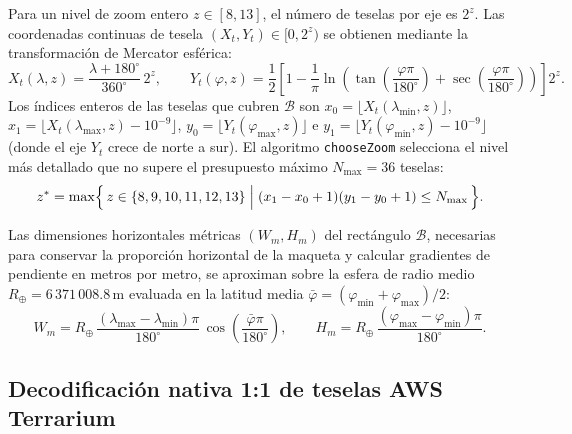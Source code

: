 \documentclass[11pt,a4paper]{article}
\newcommand{\unit}[1]{\mathrm{#1}}
\begin{document}
Para un nivel de zoom entero $z\in[8,13]$, el número de teselas por eje es $2^z$. Las coordenadas continuas
de tesela $(X_t,Y_t)\in[0,2^z)$ se obtienen mediante la transformación de Mercator esférica:
\begin{equation}
  X_t(\lambda,z) = \frac{\lambda + 180^\circ}{360^\circ}\,2^z,
  \qquad
  Y_t(\varphi,z) = \frac{1}{2}\left[
    1 - \frac{1}{\pi}\ln\!\left(\tan\!\left(\frac{\varphi\pi}{180^\circ}\right)
    + \sec\!\left(\frac{\varphi\pi}{180^\circ}\right)\right)
  \right] 2^z .
  \label{eq:mercator-tiles}
\end{equation}
Los índices enteros de las teselas que cubren $\mathcal{B}$ son
$x_0=\lfloor X_t(\lambda_{\min},z)\rfloor$, $x_1=\lfloor X_t(\lambda_{\max},z)-10^{-9}\rfloor$,
$y_0=\lfloor Y_t(\varphi_{\max},z)\rfloor$ e $y_1=\lfloor Y_t(\varphi_{\min},z)-10^{-9}\rfloor$ (donde el eje
$Y_t$ crece de norte a sur). El algoritmo \texttt{chooseZoom} selecciona el nivel más detallado que no supere
el presupuesto máximo $N_{\max}=36$ teselas:
\begin{equation}
  z^\ast = \max\Bigl\{\, z\in\{8,9,10,11,12,13\} \;\Big|\;
  (x_1 - x_0 + 1)(y_1 - y_0 + 1) \le N_{\max} \,\Bigr\}.
  \label{eq:choose-zoom}
\end{equation}

Las dimensiones horizontales métricas $(W_m,H_m)$ del rectángulo $\mathcal{B}$, necesarias para conservar la
proporción horizontal de la maqueta y calcular gradientes de pendiente en metros por metro, se aproximan sobre
la esfera de radio medio $R_\oplus = 6\,371\,008.8\,\unit{m}$ evaluada en la latitud media
$\bar\varphi = (\varphi_{\min}+\varphi_{\max})/2$:
\begin{equation}
  W_m = R_\oplus\,\frac{(\lambda_{\max}-\lambda_{\min})\pi}{180^\circ}\,\cos\!\left(\frac{\bar\varphi\pi}{180^\circ}\right),
  \qquad
  H_m = R_\oplus\,\frac{(\varphi_{\max}-\varphi_{\min})\pi}{180^\circ}.
  \label{eq:bbox-metros}
\end{equation}

\subsection{Decodificación nativa 1:1 de teselas AWS Terrarium}
\label{sec:relieve3d-terrarium}
\end{document}
